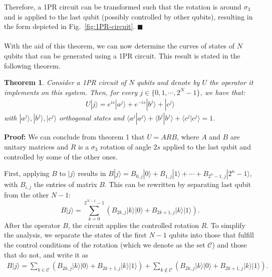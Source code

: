 \documentclass[10pt,letterpaper]{article} %
\newcommand{\fref}[1]{Fig.~\ref{#1}}
\newtheorem{theorem}{Theorem}
\begin{document}
Therefore, a 1PR circuit can be transformed such
that the rotation is around $\sigma_3$ and is applied to the last qubit 
(possibly controlled by other qubits), 
resulting in the form depicted in \fref{fig:1PR-circuit}. 
$\blacksquare$ \\
$\;$\\

With the aid of this theorem, we can now determine the curves
of states of $N$ qubits that can be generated using a 1PR circuit. 
This result is stated in the following theorem.

\begin{theorem}
\label{theorem2}
Consider a 1PR circuit of $N$ qubits
and denote by $U$ the operator it implements on this system. 
Then, for every $j \in \{0, 1, \cdots, 2^N-1\}$, 
we have that:
\begin{align*}
U|j\rangle = e^{is} |a^j\rangle + e^{-is} |b^j\rangle + |c^j\rangle
\end{align*}
with $|a^j\rangle ,|b^j\rangle, |c^j\rangle$ orthogonal states and $\langle a^j| a^j\rangle + \langle b^j| b^j\rangle + \langle
c^j|c^j \rangle = 1$.
\end{theorem}
\textbf{Proof:} 
We can conclude from theorem 1 that $U=ARB$,
where $A$ and $B$ are unitary matrices and $R$ is a $\sigma_3$ rotation of angle $2s$
applied to the last qubit and controlled by some of the other ones. 

First, applying $B$ to $|j\rangle$ results in $B|j\rangle = B_{0,j} |0\rangle + B_{1,j} |1 \rangle + \cdots + B_{2^n-1,j}|2^n-1\rangle$,
with $B_{i,j}$ the entries of matrix $B$.
This can be rewritten by separating last qubit from the other $N-1$:
\begin{equation}
B|j\rangle = \sum_{k=0}^{2^{N-1}-1} \left( B_{2k,j} |k\rangle|0\rangle  + B_{2k+1,j} |k \rangle |1\rangle  \right).
\end{equation}
After the operator $B$, the circuit applies the  controlled rotation $R$.
To simplify the analysis, we separate the states of
the first $N-1$ qubits into those that fulfill the control conditions of the rotation
(which we denote as the set $\mathcal{C}$)
and those that do not, and write it as
\begin{align}
B|j\rangle = 
   \sum_{k \in \mathcal{C}} \left( B_{2k,j} |k\rangle|0\rangle 
                                     + B_{2k+1,j} |k \rangle |1\rangle  \right) 
   + \sum_{k \not\in \mathcal{C}} \left( B_{2k,j} |k\rangle|0\rangle  
                                      + B_{2k+1,j} |k \rangle |1\rangle  \right).
\end{align}
\end{document}
